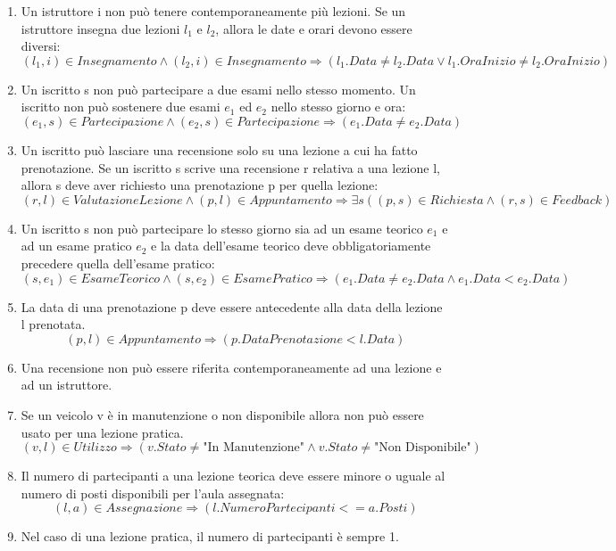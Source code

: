 \documentclass[10pt,twoside]{article}
\begin{document}
{    \begin{enumerate}
        \item Un istruttore i non può tenere contemporaneamente più lezioni. Se un istruttore insegna due lezioni $l_1$ e $l_2$, allora le date e orari devono essere diversi:
        \vspace{-.1cm}
        \[(l_1,i)\in Insegnamento\land (l_2 ,i)\in Insegnamento\Rightarrow(l_1.Data\neq l_2.Data \lor l_1.OraInizio \neq l_2.OraInizio)\]
        \item Un iscritto s non può partecipare a due esami nello stesso momento. Un iscritto non può sostenere due esami $e_1$ ed $e_2$ nello stesso giorno e ora:
        \vspace{-.1cm}
        \[(e_1,s)\in Partecipazione\land (e_2,s)\in Partecipazione\Rightarrow(e_1.Data\neq e_2.Data)\]
        \item Un iscritto può lasciare una recensione solo su una lezione a cui ha fatto prenotazione. Se un iscritto s scrive una recensione r relativa a una lezione l, allora s deve aver richiesto una prenotazione p per quella lezione:
        \vspace{-.1cm}
        \[(r,l)\in ValutazioneLezione \land (p,l)\in Appuntamento\Rightarrow \exists s((p,s)\in Richiesta\land (r,s)\in Feedback)\]
        \item Un iscritto s non può partecipare lo stesso giorno sia ad un esame teorico $e_1$ e ad un esame pratico $e_2$ e la data dell'esame teorico deve obbligatoriamente precedere quella dell'esame pratico:
        \vspace{-.1cm}
        \[(s,e_1)\in EsameTeorico \land (s,e_2)\in EsamePratico\Rightarrow (e_1.Data\neq e_2.Data \land e_1.Data < e_2.Data)\]
        \item La data di una prenotazione p deve essere antecedente alla data della lezione l prenotata.
        \vspace{-.1cm}
        \[(p,l)\in Appuntamento \Rightarrow (p.DataPrenotazione < l.Data)\]
        \item Una recensione non può essere riferita contemporaneamente ad una lezione e ad un istruttore. 
        \item Se un veicolo v è in manutenzione o non disponibile allora non può essere usato per una lezione pratica.
        \[(v,l)\in Utilizzo \Rightarrow (v.Stato \neq \text{"In Manutenzione"} \land v.Stato \neq \text{"Non Disponibile"})\] 
        \item Il numero di partecipanti a una lezione teorica deve essere minore o uguale al numero di posti disponibili per l'aula assegnata:
        \[(l,a)\in Assegnazione \Rightarrow (l.NumeroPartecipanti <= a.Posti)\]
        \item Nel caso di una lezione pratica, il numero di partecipanti è sempre 1.
    \end{enumerate}

}
\end{document}
